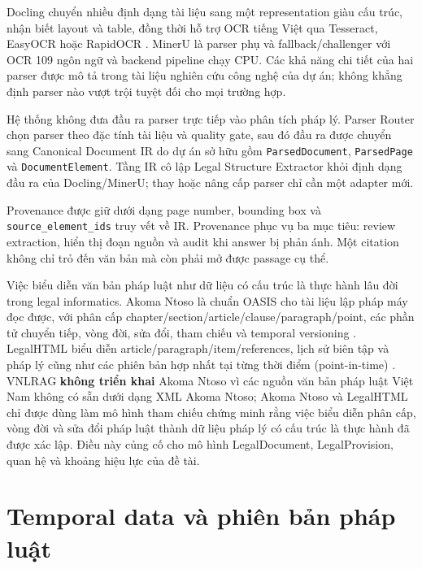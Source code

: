 \documentclass[a4paper,12pt]{extreport}
\newcommand{\code}[1]{\texttt{#1}}
\begin{document}
Docling chuyển nhiều định dạng tài liệu sang một representation giàu cấu trúc, nhận biết layout và table, đồng thời hỗ trợ OCR tiếng Việt qua Tesseract, EasyOCR hoặc RapidOCR \cite{auer2024docling}. MinerU là parser phụ và fallback/challenger với OCR 109 ngôn ngữ và backend pipeline chạy CPU. Các khả năng chi tiết của hai parser được mô tả trong tài liệu nghiên cứu công nghệ của dự án; không khẳng định parser nào vượt trội tuyệt đối cho mọi trường hợp.

Hệ thống không đưa đầu ra parser trực tiếp vào phân tích pháp lý. Parser Router chọn parser theo đặc tính tài liệu và quality gate, sau đó đầu ra được chuyển sang Canonical Document IR do dự án sở hữu gồm \code{ParsedDocument}, \code{ParsedPage} và \code{DocumentElement}. Tầng IR cô lập Legal Structure Extractor khỏi định dạng đầu ra của Docling/MinerU; thay hoặc nâng cấp parser chỉ cần một adapter mới.

\begin{sloppypar}
Provenance được giữ dưới dạng page number, bounding box và \code{source\_element\_ids} truy vết về IR. Provenance phục vụ ba mục tiêu: review extraction, hiển thị đoạn nguồn và audit khi answer bị phản ánh. Một citation không chỉ trỏ đến văn bản mà còn phải mở được passage cụ thể.
\end{sloppypar}

Việc biểu diễn văn bản pháp luật như dữ liệu có cấu trúc là thực hành lâu đời trong legal informatics. Akoma Ntoso là chuẩn OASIS cho tài liệu lập pháp máy đọc được, với phân cấp chapter/section/article/clause/paragraph/point, các phần tử chuyển tiếp, vòng đời, sửa đổi, tham chiếu và temporal versioning \cite{akomantoso2018}. LegalHTML biểu diễn article/paragraph/item/references, lịch sử biên tập và pháp lý cũng như các phiên bản hợp nhất tại từng thời điểm (point-in-time) \cite{stellato2023legalhtml}. VNLRAG \textbf{không triển khai} Akoma Ntoso vì các nguồn văn bản pháp luật Việt Nam không có sẵn dưới dạng XML Akoma Ntoso; Akoma Ntoso và LegalHTML chỉ được dùng làm mô hình tham chiếu chứng minh rằng việc biểu diễn phân cấp, vòng đời và sửa đổi pháp luật thành dữ liệu pháp lý có cấu trúc là thực hành đã được xác lập. Điều này củng cố cho mô hình LegalDocument, LegalProvision, quan hệ và khoảng hiệu lực của đề tài.

\section{Temporal data và phiên bản pháp luật}
\end{document}
